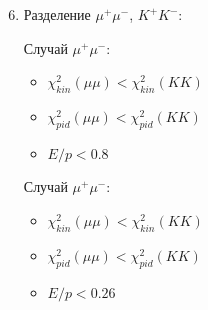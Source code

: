\documentclass[unicode]{beamer}
\newcommand{\uu}{\mu^{+}\mu^{-}}
\newcommand{\KK}{K^{+}K^{-}}
\begin{document}
\begin{frame}
	\begin{enumerate}
			\setcounter{enumi}{5}
		\item Разделение $\uu$,  $\KK$: \\
			\begin{minipage}{0.45\textwidth}
			 Случай $\uu$:
				\begin{itemize}
					\item $\chi_{kin}^2(\mu\mu) < \chi_{kin}^2(KK)$
					\item $\chi_{pid}^2(\mu\mu) < \chi_{pid}^2(KK)$
					\item $E/p < 0.8$
				\end{itemize}
			\end{minipage}
			\hfill
			\begin{minipage}{0.45\textwidth}
	 Случай $\uu$:
		\begin{itemize}
			\item $\chi_{kin}^2(\mu\mu) < \chi_{kin}^2(KK)$
			\item $\chi_{pid}^2(\mu\mu) < \chi_{pid}^2(KK)$
			\item $E/p < 0.26$
		\end{itemize}
			\end{minipage}
	\end{enumerate}
\end{frame}
\end{document}
